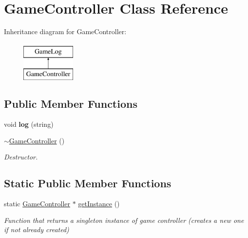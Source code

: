 \hypertarget{class_game_controller}{}\section{Game\+Controller Class Reference}
\label{class_game_controller}
Inheritance diagram for Game\+Controller\+:\begin{figure}[H]
\begin{center}
\leavevmode
\includegraphics[height=2.000000cm]{class_game_controller}
\end{center}
\end{figure}
\subsection*{Public Member Functions}
\begin{DoxyCompactItemize}
\item 
\hypertarget{class_game_controller_a12aa69c33d0669a1015708e8c6b6b102}{}\label{class_game_controller_a12aa69c33d0669a1015708e8c6b6b102} 
void {\bfseries log} (string)
\item 
\hypertarget{class_game_controller_aab436961a422d078975bc7a49bdfcab7}{}\label{class_game_controller_aab436961a422d078975bc7a49bdfcab7} 
\hyperlink{class_game_controller_aab436961a422d078975bc7a49bdfcab7}{$\sim$\+Game\+Controller} ()
\begin{DoxyCompactList}\small\item\em Destructor. \end{DoxyCompactList}\end{DoxyCompactItemize}
\subsection*{Static Public Member Functions}
\begin{DoxyCompactItemize}
\item 
\hypertarget{class_game_controller_a3654fa1802cce0e37e59264f46879140}{}\label{class_game_controller_a3654fa1802cce0e37e59264f46879140} 
static \hyperlink{class_game_controller}{Game\+Controller} $\ast$ \hyperlink{class_game_controller_a3654fa1802cce0e37e59264f46879140}{get\+Instance} ()
\begin{DoxyCompactList}\small\item\em Function that returns a singleton instance of game controller (creates a new one if not already created) \end{DoxyCompactList}\end{DoxyCompactItemize}
